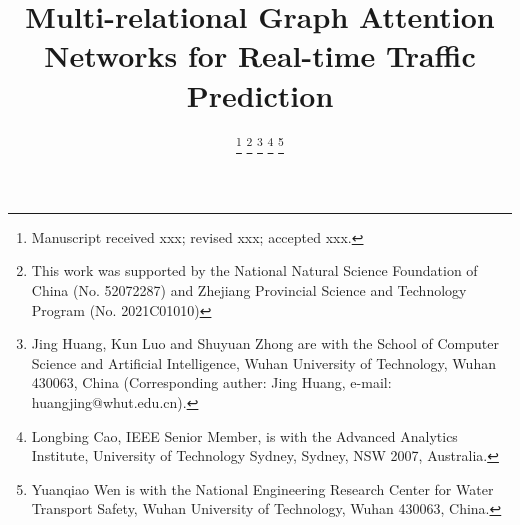 \documentclass[journal]{IEEEtran}
\begin{document}
\title{Multi-relational Graph Attention Networks for Real-time Traffic Prediction}

\author{
    \thanks{Manuscript received xxx; revised xxx; accepted xxx.}
    \thanks{This work was supported by the National Natural Science Foundation of China (No. 52072287) and Zhejiang  Provincial  Science  and  Technology  Program (No. 2021C01010)}
    \thanks{Jing Huang, Kun Luo and Shuyuan Zhong are with the School of Computer Science and Artificial Intelligence, Wuhan University of Technology, Wuhan 430063, China (Corresponding auther: Jing Huang, e-mail: huangjing@whut.edu.cn).}
    \thanks{Longbing Cao, IEEE Senior Member, is with the Advanced Analytics Institute, University of Technology Sydney, Sydney, NSW 2007, Australia.}
    \thanks{Yuanqiao Wen is with the National Engineering Research Center for Water Transport Safety, Wuhan University of Technology, Wuhan 430063, China.}
}
\end{document}
